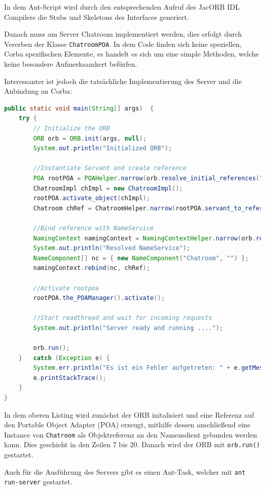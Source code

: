 In dem Ant-Script wird durch den entsprechenden Aufruf des JacORB IDL Compilers die Stubs und Skeletons des Interfaces generiert.

Danach muss am Server Chatroom implementiert werden, dies erfolgt durch Vererben der Klasse \texttt{ChatroomPOA}.
In dem Code finden sich keine speziellen, Corba spezifischen Elemente, es handelt es sich um eine simple Methoden, welche keine besondere Aufmerksamkert bef\"urfen.

Interessanter ist jedoch die tats\"achliche Implementierung des Server und die Anbindung an Corba:
\begin{lstlisting}[language=Java, caption=Server Main Methode]
public static void main(String[] args)  {
    try {
        // Initialize the ORB
        ORB orb = ORB.init(args, null);
        System.out.println("Initialized ORB");

        //Instantiate Servant and create reference
        POA rootPOA = POAHelper.narrow(orb.resolve_initial_references("RootPOA"));
        ChatroomImpl chImpl = new ChatroomImpl();
        rootPOA.activate_object(chImpl);
        Chatroom chRef = ChatroomHelper.narrow(rootPOA.servant_to_reference(chImpl));

        //Bind reference with NameService
        NamingContext namingContext = NamingContextHelper.narrow(orb.resolve_initial_references("NameService"));
        System.out.println("Resolved NameService");
        NameComponent[] nc = { new NameComponent("Chatroom", "") };
        namingContext.rebind(nc, chRef);

        //Activate rootpoa
        rootPOA.the_POAManager().activate();

        //Start readthread and wait for incoming requests
        System.out.println("Server ready and running ....");

        orb.run();
    }	catch (Exception e)	{
        System.err.println("Es ist ein Fehler aufgetreten: " + e.getMessage());
        e.printStackTrace();
    }
}
\end{lstlisting}

In dem oberen Listing wird zun\"achst der ORB initalisiert und eine Referenz auf den Portable Object Adapter (POA) erzeugt, mithilfe dessen anschlie\ss end eine Instance von \texttt{Chatroom} als Objektreferenz an den Namensdient gebunden werden kann.
Dies geschieht in den Zeilen 7 bis 20.
Danach wird der ORB mit \texttt{orb.run()} gestartet.

Auch f\"ur die Ausf\"uhrung des Servers gibt es einen Ant-Task, welcher mit \texttt{ant run-server} gestartet.

